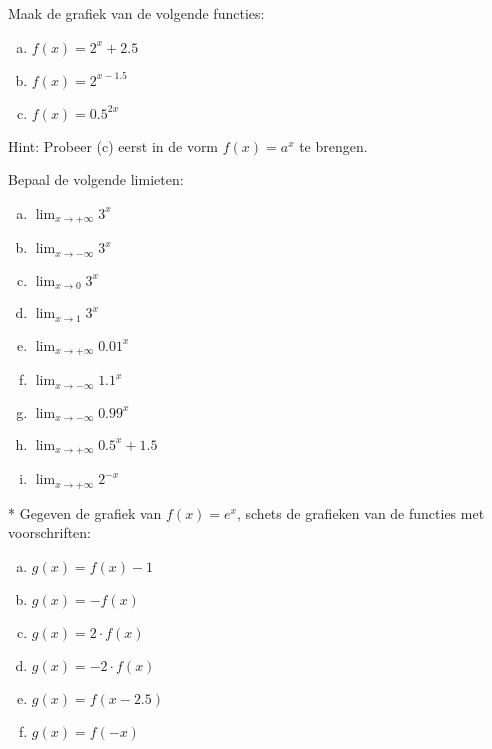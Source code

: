 \documentclass[12pt,twoside]{article}
\begin{document}
\begin{oefening}
Maak de grafiek van de volgende functies:
\begin{multicols}{3}
\begin{enumerate}[(a)]
  \item $f(x)=2^x+2.5$
  \item $f(x)=2^{x-1.5}$
  \item $f(x)=0.5^{2x}$
\end{enumerate}
\end{multicols}
Hint: Probeer (c) eerst in de vorm $f(x)=a^x$ te brengen.
\end{oefening}

\begin{oefening}
Bepaal de volgende limieten:
\begin{multicols}{3}
\begin{enumerate}[(a)]
  \item $\displaystyle\lim_{x\to+\infty}3^x$
  \item $\displaystyle\lim_{x\to-\infty}3^x$
  \item $\displaystyle\lim_{x\to0}3^x$
  \item $\displaystyle\lim_{x\to1}3^x$
  \item $\displaystyle\lim_{x\to+\infty}0.01^x$
  \item $\displaystyle\lim_{x\to-\infty}1.1^x$
  \item $\displaystyle\lim_{x\to-\infty}0.99^x$
  \item $\displaystyle\lim_{x\to+\infty}0.5^x+1.5$
  \item $\displaystyle\lim_{x\to+\infty}2^{-x}$
\end{enumerate}
\end{multicols}
\end{oefening}

\begin{oefening}*
Gegeven de grafiek van $f(x)=e^x$, schets de grafieken van de functies met voorschriften:
\begin{multicols}{3}
\begin{enumerate}[(a)]
  \item $g(x)=f(x)-1$
  \item $g(x)=-f(x)$
  \item $g(x)=2\cdot f(x)$
  \item $g(x)=-2\cdot f(x)$
  \item $g(x)=f(x-2.5)$
  \item $g(x)=f(-x)$
\end{enumerate}
\end{multicols}
\end{oefening}
\end{document}
